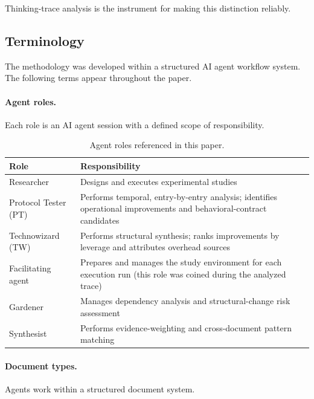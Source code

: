 \documentclass[11pt,a4paper]{article}
\begin{document}
Thinking-trace analysis is the instrument for making this distinction reliably.

\subsection{Terminology}

The methodology was developed within a structured AI agent workflow system. The
following terms appear throughout the paper.

\paragraph{Agent roles.} Each role is an AI agent session with a defined scope
of responsibility.

\begin{table}[h]
\centering
\small
\caption{Agent roles referenced in this paper.}
\label{tab:roles}
\begin{tabular}{@{}lp{9.5cm}@{}}
\toprule
Role & Responsibility \\
\midrule
Researcher & Designs and executes experimental studies \\
Protocol Tester (PT) & Performs temporal, entry-by-entry analysis; identifies operational improvements and behavioral-contract candidates \\
Technowizard (TW) & Performs structural synthesis; ranks improvements by leverage and attributes overhead sources \\
Facilitating agent & Prepares and manages the study environment for each execution run (this role was coined during the analyzed trace) \\
Gardener & Manages dependency analysis and structural-change risk assessment \\
Synthesist & Performs evidence-weighting and cross-document pattern matching \\
\bottomrule
\end{tabular}
\end{table}

\paragraph{Document types.} Agents work within a structured document system.
\end{document}
